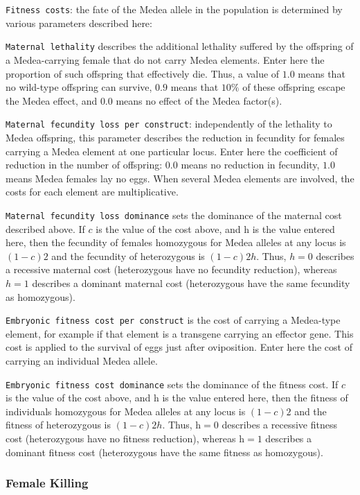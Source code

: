 \documentclass[11pt]{article}
\newcommand{\linecmd}[1]{\texttt{#1}}
\begin{document}
\linecmd{Fitness costs}: the fate of the Medea allele in the population is determined by various parameters described here:

\linecmd{Maternal lethality} describes the additional lethality suffered by the offspring of a Medea-carrying female that do not carry Medea elements. Enter here the proportion of such offspring that effectively die. Thus, a value of $1.0$ means that no wild-type offspring can survive, $0.9$ means that $10\%$ of these offspring escape the Medea effect, and $0.0$ means no effect of the Medea factor(s). 

\linecmd{Maternal fecundity loss per construct}: independently of the lethality to Medea offspring, this parameter describes the reduction in fecundity for females carrying a Medea element at one particular locus. Enter here the coefficient of reduction in the number of offspring: $0.0$ means no reduction in fecundity, $1.0$ means Medea females lay no eggs. When several Medea elements are involved, the costs for each element are multiplicative.

\linecmd{Maternal fecundity loss dominance} sets the dominance of the maternal cost described above. If $c$ is the value of the cost above, and h is the value entered here, then the fecundity of females homozygous for Medea alleles at any locus is $(1-c)2$ and the fecundity of heterozygous is $(1-c)2h$. Thus, $h=0$ describes a recessive maternal cost (heterozygous have no fecundity reduction), whereas $h=1$ describes a dominant maternal cost (heterozygous have the same fecundity as homozygous). 

\linecmd{Embryonic fitness cost per construct} is the cost of carrying a Medea-type element, for example if that element is a transgene carrying an effector gene. This cost is applied to the survival of eggs just after oviposition. Enter here the cost of carrying an individual Medea allele. 

\linecmd{Embryonic fitness cost dominance} sets the dominance of the fitness cost. If $c$ is the value of the cost above, and h is the value entered here, then the fitness of individuals homozygous for Medea alleles at any locus is $(1-c)2$ and the fitness of heterozygous is $(1-c)2h$. Thus, h$=0$ describes a recessive fitness cost (heterozygous have no fitness reduction), whereas h$=1$ describes a dominant fitness cost (heterozygous have the same fitness as homozygous).

\subsubsection{Female Killing}%
\end{document}
